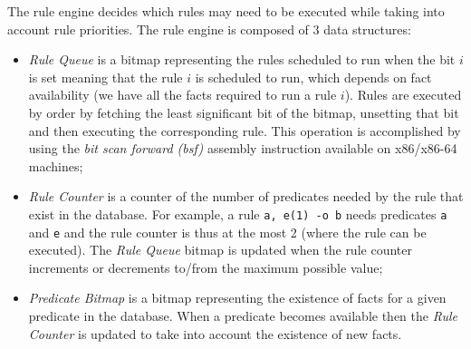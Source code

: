 The rule engine decides which rules may need to be executed while taking into
account rule priorities. The rule engine is composed of 3 data structures:

\begin{itemize}

   \item \emph{Rule Queue} is a bitmap representing the rules scheduled to run
      when the bit $i$ is set meaning that the rule $i$ is scheduled to run,
      which depends on fact availability (we have all the facts required to run
      a rule $i$). Rules are executed by order by fetching the least significant
      bit of the bitmap, unsetting that bit and then executing the corresponding
      rule. This operation is accomplished by using the \emph{bit scan
      forward (bsf)} assembly instruction available on x86/x86-64 machines;

   \item \emph{Rule Counter} is a counter of the number of predicates needed by
      the rule that exist in the database. For example, a rule \texttt{a, e(1)
      -o b} needs predicates \texttt{a} and \texttt{e} and the rule counter is
      thus at the most 2 (where the rule can be executed). The \emph{Rule Queue}
      bitmap is updated when the rule counter increments or decrements to/from
      the maximum possible value;

   \item \emph{Predicate Bitmap} is a bitmap representing the existence of facts
      for a given predicate in the database. When a predicate becomes available
      then the \emph{Rule Counter} is updated to take into account the existence
      of new facts.

\end{itemize}


